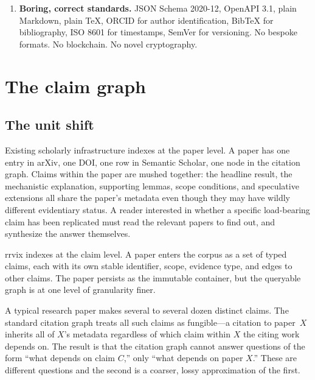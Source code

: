 \documentclass[11pt]{rrvix}
\begin{document}
\begin{enumerate}[leftmargin=2em, itemsep=0.4em]
\item \textbf{Boring, correct standards.} JSON Schema 2020-12, OpenAPI 3.1, plain Markdown, plain TeX, ORCID for author identification, BibTeX for bibliography, ISO 8601 for timestamps, SemVer for versioning. No bespoke formats. No blockchain. No novel cryptography.

\end{enumerate}

\section{The claim graph}
\label{sec:claim-graph}

\subsection{The unit shift}

Existing scholarly infrastructure indexes at the paper level. A paper has one entry in arXiv, one DOI, one row in Semantic Scholar, one node in the citation graph. Claims within the paper are mushed together: the headline result, the mechanistic explanation, supporting lemmas, scope conditions, and speculative extensions all share the paper's metadata even though they may have wildly different evidentiary status. A reader interested in whether a specific load-bearing claim has been replicated must read the relevant papers to find out, and synthesize the answer themselves.

rrvix indexes at the claim level. A paper enters the corpus as a set of typed claims, each with its own stable identifier, scope, evidence type, and edges to other claims. The paper persists as the immutable container, but the queryable graph is at one level of granularity finer.

\begin{observation}
A typical research paper makes several to several dozen distinct claims. The standard citation graph treats all such claims as fungible---a citation to paper~$X$ inherits all of $X$'s metadata regardless of which claim within $X$ the citing work depends on. The result is that the citation graph cannot answer questions of the form ``what depends on claim $C$,'' only ``what depends on paper $X$.'' These are different questions and the second is a coarser, lossy approximation of the first.
\end{observation}
\end{document}
